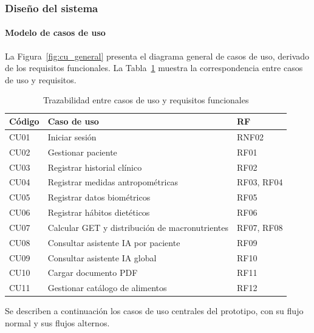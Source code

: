 \subsubsection{Diseño del sistema}

\paragraph{Modelo de casos de uso}

La Figura~\ref{fig:cu_general} presenta el diagrama general de casos de uso,
derivado de los requisitos funcionales. La Tabla~\ref{tab:traza_cu} muestra la
correspondencia entre casos de uso y requisitos.


\begin{table}[H]
\centering\small
\caption{Trazabilidad entre casos de uso y requisitos funcionales}\label{tab:traza_cu}
\begin{tabular}{|l|l|l|}
\hline
\textbf{Código} & \textbf{Caso de uso} & \textbf{RF} \\ \hline
CU01 & Iniciar sesión & RNF02 \\ \hline
CU02 & Gestionar paciente & RF01 \\ \hline
CU03 & Registrar historial clínico & RF02 \\ \hline
CU04 & Registrar medidas antropométricas & RF03, RF04 \\ \hline
CU05 & Registrar datos biométricos & RF05 \\ \hline
CU06 & Registrar hábitos dietéticos & RF06 \\ \hline
CU07 & Calcular GET y distribución de macronutrientes & RF07, RF08 \\ \hline
CU08 & Consultar asistente IA por paciente & RF09 \\ \hline
CU09 & Consultar asistente IA global & RF10 \\ \hline
CU10 & Cargar documento PDF & RF11 \\ \hline
CU11 & Gestionar catálogo de alimentos & RF12 \\ \hline
\end{tabular}
\end{table}

Se describen a continuación los casos de uso centrales del prototipo, con su
flujo normal y sus flujos alternos. 

